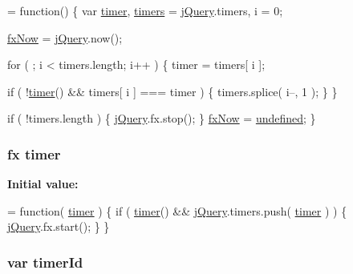 \begin{DoxyCode}
= \textcolor{keyword}{function}() \{
    var \hyperlink{jquery-1_810_82_8js_a2b44b4db680ed005831a801cef9f8bb3}{timer},
        \hyperlink{jquery-1_810_82_8js_a90bf6571856437dc2269be68a12c1d5a}{timers} = \hyperlink{jquery-1_810_82_8js_a5e01048fbd3a30b44e8d491d8945c457}{jQuery}.timers,
        i = 0;

    \hyperlink{jquery-1_810_82_8js_a008b3271e2f410e89917bc6d96096296}{fxNow} = \hyperlink{jquery-1_810_82_8js_a5e01048fbd3a30b44e8d491d8945c457}{jQuery}.now();

    \textcolor{keywordflow}{for} ( ; i < timers.length; i++ ) \{
        timer = timers[ i ];
        
        \textcolor{keywordflow}{if} ( !\hyperlink{jquery-1_810_82_8js_a2b44b4db680ed005831a801cef9f8bb3}{timer}() && timers[ i ] === timer ) \{
            timers.splice( i--, 1 );
        \}
    \}

    \textcolor{keywordflow}{if} ( !timers.length ) \{
        \hyperlink{jquery-1_810_82_8js_a5e01048fbd3a30b44e8d491d8945c457}{jQuery}.fx.stop();
    \}
    \hyperlink{jquery-1_810_82_8js_a008b3271e2f410e89917bc6d96096296}{fxNow} = \hyperlink{jquery-1_810_82_8js_a08113a236cc18d2a9d5ce27e638012be}{undefined};
\}
\end{DoxyCode}
\hypertarget{jquery-1_810_82_8js_a2b44b4db680ed005831a801cef9f8bb3}{
\subsubsection[{timer}]{ {\bf fx} timer}}\label{jquery-1_810_82_8js_a2b44b4db680ed005831a801cef9f8bb3}
{\bfseries Initial value\-:}
\begin{DoxyCode}
= \textcolor{keyword}{function}( \hyperlink{jquery-1_810_82_8js_a2b44b4db680ed005831a801cef9f8bb3}{timer} ) \{
    \textcolor{keywordflow}{if} ( \hyperlink{jquery-1_810_82_8js_a2b44b4db680ed005831a801cef9f8bb3}{timer}() && \hyperlink{jquery-1_810_82_8js_a5e01048fbd3a30b44e8d491d8945c457}{jQuery}.timers.push( \hyperlink{jquery-1_810_82_8js_a2b44b4db680ed005831a801cef9f8bb3}{timer} ) ) \{
        \hyperlink{jquery-1_810_82_8js_a5e01048fbd3a30b44e8d491d8945c457}{jQuery}.fx.start();
    \}
\}
\end{DoxyCode}
\hypertarget{jquery-1_810_82_8js_aa447439fbe7027e58837a297297c9d8a}{
\subsubsection[{timer\-Id}]{\setlength{\rightskip}{0pt plus 5cm}var timer\-Id}}\label{jquery-1_810_82_8js_aa447439fbe7027e58837a297297c9d8a}

